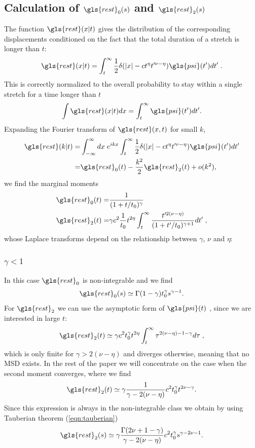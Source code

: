 \subsection*{Calculation of  $\gls{rest}_0(s)$ and $\gls{rest}_2(s)$}
The function $\gls{rest}(x|t)$ gives the distribution of
the corresponding displacements conditioned on the fact that the total duration of a stretch is longer than $t$:
\begin{equation}
 \gls{rest}(x|t) =  \int_t^\infty \frac{1}{2} \delta(|x| - c t^{\eta}t'^{\nu-\eta}) \gls{psi}(t') dt' \; .
\end{equation}
This is correctly normalized to the overall probability to stay within a single stretch for a time longer than $t$ 
\begin{equation}
 \int \gls{rest}(x|t)  dx = \int_t^\infty \gls{psi}(t') dt'.
\end{equation}
Expanding the Fourier transform of $\gls{rest}(x,t)$ for small $k$,
\begin{align}
\gls{rest}(k|t) =& \int_{-\infty}^{\infty} dx \; e^{ikx} \int_t^\infty \frac{1}{2} \delta(|x| - c t^{\eta}t'^{\nu-\eta}) \gls{psi}(t') dt' \nonumber \\
=& \gls{rest}_0(t) - \frac{k^2}{2} \gls{rest}_2(t) + o(k^2), 
\end{align}
we find the marginal moments
\begin{align}
\gls{rest}_0(t) =& \frac{1}{(1+t/t_0)^{\gamma}} \\
\gls{rest}_2(t) =& \gamma c^2 \frac{1 }{t_0} t^{2\eta} \int_t^\infty \frac{t'^{2(\nu-\eta)}}{(1+t'/t_0)^{\gamma+1}} dt' \; , 
\end{align}
whose Laplace transforms depend on the relationship between $\gamma$, $\nu$ and $\eta$: 

\subsubsection{$\gamma<1 $ }
In this case $\gls{rest}_0$ is non-integrable and we find
\begin{equation}
  \gls{rest}_0(s) \simeq  \Gamma(1-\gamma) t_0^\gamma s^{\gamma-1}.
\end{equation}
For $\gls{rest}_2$  we can use the asymptotic form of $\gls{psi}(t)$ , since we are interested in large $t$:
\begin{equation}
\gls{rest}_2(t) \simeq \gamma c^2 t_0^\gamma t^{2\eta} \int_t^\infty \tau^{2(\nu-\eta)-1-\gamma}  d\tau   \; , 
\end{equation}
which is only finite for $\gamma > 2(\nu-\eta)$ and diverges otherwise, meaning that no MSD exists. In the rest of 
the paper we will concentrate on the case when the second moment converges, where we find
\begin{equation}
\gls{rest}_{2}(t)  \simeq \gamma\frac{1} {\gamma - 2(\nu-\eta)} c^2 t_0^\gamma t^{2\nu -\gamma}  .
\end{equation}
Since this expression is always in the non-integrable class we obtain by using Tauberian theorem (\ref{eqn:tauberian})
\begin{equation}
\gls{rest}_2(s) \simeq \gamma  \frac{ \Gamma(2\nu+1-\gamma)}{\gamma - 2(\nu-\eta)}c^2 t_0^\gamma s^{\gamma - 2\nu-1}.
\end{equation}

